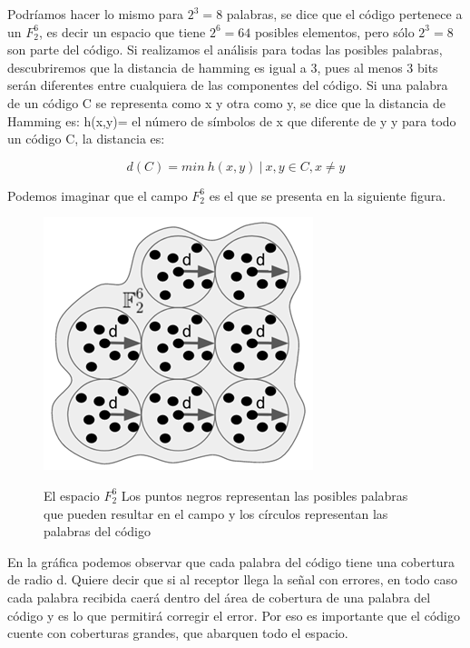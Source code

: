 Podríamos hacer lo mismo para $2^{3}=8$ palabras, se dice que el código pertenece a un $F_{2}^{6}$, es decir un espacio que tiene $2^{6}=64$ posibles elementos, pero sólo $2^{3}=8$ son parte del código.
Si realizamos el análisis para todas las posibles palabras, descubriremos que la distancia de hamming es igual a 3, pues al menos 3 bits serán diferentes entre cualquiera de las componentes del código.
Si una palabra de un código C se representa como x y otra como y, se dice que la distancia de Hamming es:
h(x,y)= el número de símbolos de x que diferente de y
y para todo un código C, la distancia es: 

\begin{equation} \label{capsiete_diesiseis}
d(C) = min \ {h(x,y) \ | \ x,y \in C,x 	\neq y }
\end{equation}

Podemos imaginar que el campo $F_{2}^{6}$  es el que se presenta en la siguiente figura.

\vspace{200px}
\begin{figure}[h!]
	\captionsetup{justification = raggedright, singlelinecheck = false}
	\caption{El espacio $F_{2}^{6}$ Los puntos negros representan las posibles palabras que pueden resultar en el campo y los círculos representan las palabras del código} 
	\centering
	\includegraphics[scale=1]{Imagenes/Espacio.png}
	\label{fig:Espacio}
\end{figure}

En la gráfica podemos observar que cada palabra del código tiene una cobertura de radio d. Quiere decir que si al receptor llega la señal con errores, en todo caso cada palabra recibida caerá dentro del área de cobertura de una palabra del código y es lo que permitirá corregir el error. Por eso es importante que el código cuente con coberturas grandes, que abarquen todo el espacio. \\

